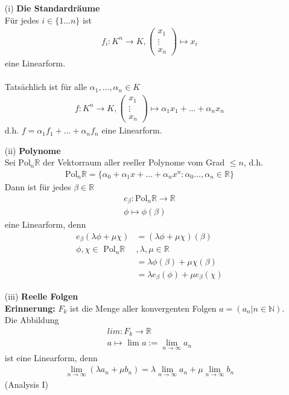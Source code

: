 \documentclass[11pt]{report}
\newcommand*\Zb[1] {\mathbb{#1}}
\newcommand*\f[1] {\textbf{#1}}
\begin{document}
\begin{itemize}
 \item[(i)] \f{Die Standardräume}\\
Für jedes $i \in \{1...n\}$ ist 
\begin{align}
f_i: K^n\rightarrow K, \begin{pmatrix} x_1 \\ \vdots \\ x_n \end{pmatrix} \mapsto x_i
\end{align}
eine Linearform.\\\\
Tatsächlich ist für alle $\alpha_1, ..., \alpha_n \in K$
\begin{align}
 f: K^n \rightarrow K, \begin{pmatrix} x_1 \\ \vdots \\ x_n \end{pmatrix} \mapsto \alpha_1 x_1 + ... + \alpha_n x_n
\end{align}
d.h. $f=\alpha_1 f_1 + ... + \alpha_n f_n$ eine Linearform.

 \item[(ii)] \f{Polynome}\\
Sei $\text{Pol}_n \Zb{R}$ der Vektorraum aller reeller Polynome vom Grad $\leq n$, d.h.
\begin{align}
 \text{Pol}_n \Zb{R} = \{\alpha_0 + \alpha_1 x + ... + \alpha_n x^n:  \alpha_0..., \alpha_n \in \Zb{R}\}
\end{align}
Dann ist für jedes $\beta \in \Zb{R}$
\begin{align}
 e_{\beta}: \text{Pol}_n \Zb{R} \rightarrow \Zb{R} \\
\phi \mapsto \phi(\beta)
\end{align}
eine Linearform, denn
\begin{align}
 e_{\beta}(\lambda\phi + \mu\chi) &= (\lambda\phi + \mu\chi)(\beta) \\
\phi, \chi \in \text{ Pol}_n \Zb{R}&, \lambda, \mu \in \Zb{R} \\
&= \lambda\phi(\beta) + \mu\chi(\beta)\\
&= \lambda e_{\beta}(\phi) + \mu e_{\beta}(\chi)
\end{align}

 \item[(iii)] \f{Reelle Folgen}\\
\f{Erinnerung:} $F_k$ ist die Menge aller konvergenten Folgen $a = (a_n | n \in \Zb{N})$.\\
Die Abbildung
\begin{align}
 lim: F_k \rightarrow \Zb{R} \\
a \mapsto \text{ lim } a := \lim\limits_{n \rightarrow \infty}{a_n}
\end{align}
ist eine Linearform, denn 
\begin{align}
 \lim\limits_{n \rightarrow \infty}{(\lambda a_n + \mu b_n)} = \lambda \lim\limits_{n \rightarrow \infty}{a_n} + \mu \lim\limits_{n \rightarrow \infty}{b_n}
\end{align}
(Analysis I)
\end{itemize}
\end{document}
